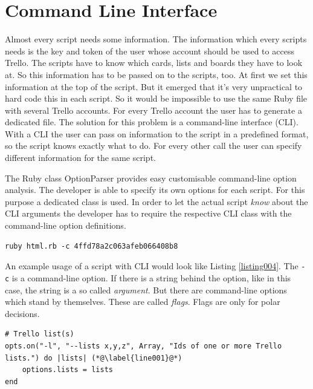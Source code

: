 \section{Command Line Interface}\label{cli}
Almost every script needs some information. The information which every scripts needs is the key and token of the user whose account should be used to access Trello. The scripts have to know which cards, lists and boards they have to look at. So this information has to be passed on to the scripts, too. At first we set this information at the top of the script. But it emerged that it's very unpractical to hard code this in each script. So it would be impossible to use the same Ruby file with several Trello accounts. For every Trello account the user has to generate a dedicated file. The solution for this problem is a command-line interface (CLI). With a CLI the user can pass on information to the script in a predefined format, so the script knows exactly what to do. For every other call the user can specify different information for the same script.

The Ruby class OptionParser\cite{ruby:optionparser} provides easy customisable command-line option analysis. The developer is able to specify its own options for each script. For this purpose a dedicated class is used. 
In order to let the actual script \emph{know} about the CLI arguments the developer has to require the respective CLI class with the command-line option definitions.

\begin{lstlisting}[aboveskip=1\baselineskip, style=bash, caption=Example usage of a script with CLI., label=listing004]
ruby html.rb -c 4ffd78a2c063afeb066408b8
\end{lstlisting}

An example usage of a script with CLI would look like Listing \ref{listing004}. The \texttt{-c} is a command-line option. If there is a string behind the option, like in this case, the string is a so called \emph{argument}. But there are command-line options which stand by themselves. These are called \emph{flags}. Flags are only for polar decisions.

\begin{lstlisting}[aboveskip=1\baselineskip, caption=Definition of a command-line option, label=listing002]
# Trello list(s)
opts.on("-l", "--lists x,y,z", Array, "Ids of one or more Trello lists.") do |lists| (*@\label{line001}@*)
	options.lists = lists
end
\end{lstlisting}

